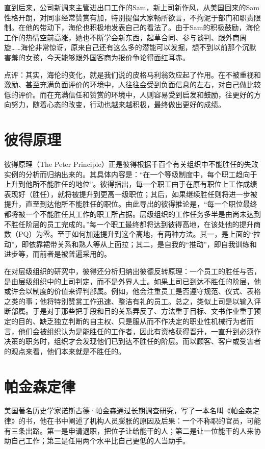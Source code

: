 \documentclass[11pt]{ctexart}
\begin{document}
直到后来，公司新调来主管进出口工作的Sam，新上司新作风，从美国回来的Sam性格开朗，对同事经常赞赏有加，特别提倡大家畅所欲言，不拘泥于部门和职责限制。在他的带动下，海伦也积极地发表自己的看法了。由于Sam的积极鼓励，海伦工作的热情空前高涨，她也不断学会新东西，起草合同、参与谈判、跟外商周旋……海伦非常惊讶，原来自己还有这么多的潜能可以发掘，想不到以前那个沉默害羞的女孩，今天能够跟外国客商为报价争论得面红耳赤。

点评：其实，海伦的变化，就是我们说的皮格马利翁效应起了作用。在不被重视和激励、甚至充满负面评价的环境中，人往往会受到负面信息的左右，对自己做比较低的评价。而在充满信任和赞赏的环境中，人则容易受到启发和鼓励，往更好的方向努力，随着心态的改变，行动也越来越积极，最终做出更好的成绩。
\section{彼得原理}
\label{sec-12}


彼得原理（The Peter Principle）正是彼得根据千百个有关组织中不能胜任的失败实例的分析而归纳出来的。其具体内容是：“在一个等级制度中，每个职工趋向于上升到他所不能胜任的地位”。彼得指出，每一个职工由于在原有职位上工作成绩表现好（胜任），就将被提升到更高一级职位；其后，如果继续胜任则将进一步被提升，直至到达他所不能胜任的职位。由此导出的彼得推论是，“每一个职位最终都将被一个不能胜任其工作的职工所占据。层级组织的工作任务多半是由尚未达到不胜任阶层的员工完成的。”每一个职工最终都将达到彼得高地，在该处他的提升商数（PQ）为零。至于如何加速提升到这个高地，有两种方法。其一，是上面的“拉动”，即依靠裙带关系和熟人等从上面拉；其二，是自我的“推动”，即自我训练和进步等，而前者是被普遍采用的。

在对层级组织的研究中，彼得还分析归纳出彼德反转原理：一个员工的胜任与否，是由层级组织中的上司判定，而不是外界人士。如果上司已到达不胜任的阶层，他或许会以制度的价值来评判部属。例如，他会注重员工是否遵守规范、仪式、表格之类的事；他将特别赞赏工作迅速、整洁有礼的员工。总之，类似上司是以输入评断部属。于是对于那些把手段和目的关系弄反了、方法重于目标、文书作业重于预定的目的、缺乏独立判断的自主权、只是服从而不作决定的职业性机械行为者而言，他们会被组织认为是能胜任的工作者，因此有资格获得晋升，一直升到必须作决策的职务时，组织才会发现他们已到达不胜任的阶层。而以顾客、客户或受害者的观点来看，他们本来就是不胜任的。
\section{帕金森定律}
\label{sec-13}


美国著名历史学家诺斯古德·帕金森通过长期调查研究，写了一本名叫《帕金森定律》的书，他在书中阐述了机构人员膨胀的原因及后果：一个不称职的官员，可能有三条出路。第一是申请退职，把位子让给能干的人；第二是让一位能干的人来协助自己工作；第三是任用两个水平比自己更低的人当助手。
\end{document}
